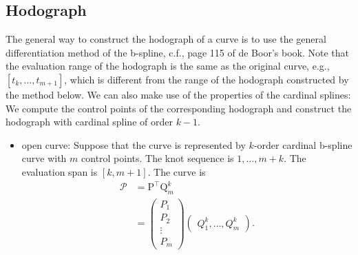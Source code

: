 \documentclass[11pt]{article}
\newcommand{\bmmp}{\bm{\mathcal{P}}} %
\newcommand{\vPT}{\bm{\mathrm{P}}^{\intercal}}
\newcommand{\vQ}{\bm{\mathrm{Q}}} %
\begin{document}
\subsection{Hodograph}
The general way to construct the hodograph of a curve is to use the general differentiation method of the b-spline, c.f., page 115 of de Boor's book. Note that the evaluation range of the hodograph is the same as the original curve, e.g., $[t_k,\dots,t_{m+1}]$, which is different from the range of the hodograph constructed by the method below.
We can also make use of the properties of the cardinal splines: We compute the control points of the corresponding hodograph and construct the hodograph with cardinal spline of order $k-1$. 
\begin{itemize}
\item open curve:
Suppose that the curve is represented by $k$-order cardinal b-spline curve with $m$ control points. The knot sequence is $1, \dots, m+k$. The evaluation span is $[k,m+1]$. The curve is 
\[
\begin{split}
\bmmp&=\vPT\vQ^k_m \\
&=
\begin{pmatrix}
P_1 \\
P_2 \\
\vdots \\
P_m
\end{pmatrix}
\begin{pmatrix}
Q^k_1,\dots,Q^k_m
\end{pmatrix}.
\end{split}
\]


\end{itemize}
\end{document}
